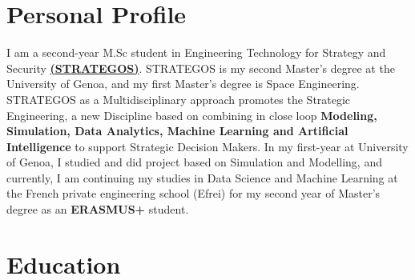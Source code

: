 \documentclass[10pt]{article} %
\begin{document}

\section{Personal Profile}

I am a second-year M.Sc student in Engineering Technology for Strategy and Security \href{http://www.itim.unige.it/cs/strategos/}{\textbf{(STRATEGOS)}}. STRATEGOS is my second Master's degree at the University of Genoa, and my first Master's degree is Space Engineering. STRATEGOS as a Multidisciplinary approach promotes the Strategic Engineering, a new Discipline based on combining in close loop \textbf{Modeling, Simulation, Data Analytics, Machine Learning and Artificial Intelligence} to support Strategic Decision Makers. In my first-year at University of Genoa, I studied and did project based on Simulation and Modelling, and currently, I am continuing my studies in Data Science and Machine Learning at the French private engineering school (Efrei) for my second year of Master’s degree as an \textbf {ERASMUS+} student.



\section{Education}

\end{document}
